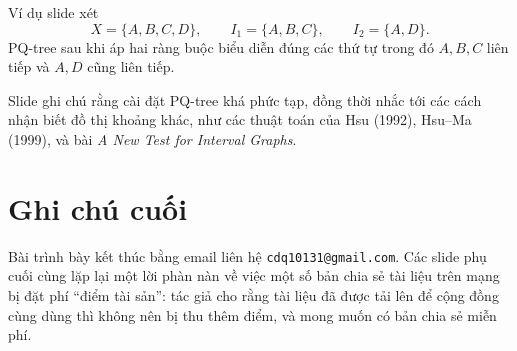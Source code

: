 \documentclass[11pt]{article}
\begin{document}
Ví dụ slide xét
\[
  X=\{A,B,C,D\},\qquad I_1=\{A,B,C\},\qquad I_2=\{A,D\}.
\]
PQ-tree sau khi áp hai ràng buộc biểu diễn đúng các thứ tự trong đó \(A,B,C\)
liên tiếp và \(A,D\) cũng liên tiếp.

Slide ghi chú rằng cài đặt PQ-tree khá phức tạp, đồng thời nhắc tới các cách
nhận biết đồ thị khoảng khác, như các thuật toán của Hsu (1992), Hsu--Ma
(1999), và bài \emph{A New Test for Interval Graphs}.

\section{Ghi chú cuối}

Bài trình bày kết thúc bằng email liên hệ \texttt{cdq10131@gmail.com}. Các
slide phụ cuối cùng lặp lại một lời phàn nàn về việc một số bản chia sẻ tài
liệu trên mạng bị đặt phí ``điểm tài sản'': tác giả cho rằng tài liệu đã được
tải lên để cộng đồng cùng dùng thì không nên bị thu thêm điểm, và mong muốn
có bản chia sẻ miễn phí.
\end{document}
